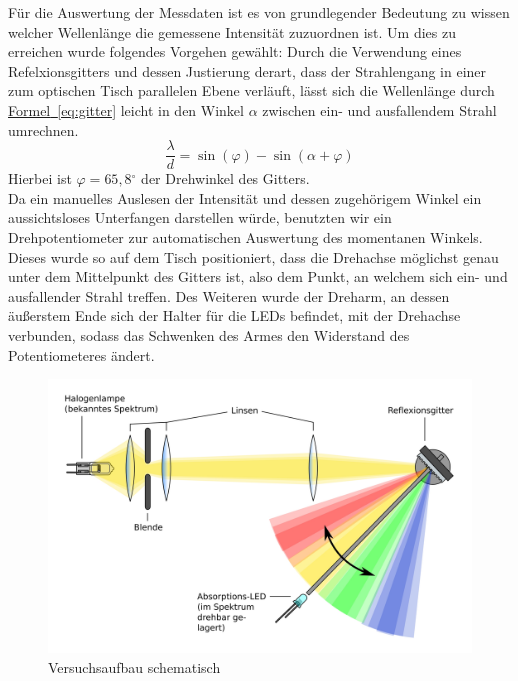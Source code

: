 \documentclass[11pt]{scrartcl}
\newcommand{\degr}{\ensuremath{^\circ}}
\newcommand{\hypref}[2]{\hyperref[#2]{{#1}~\ref{#2}}}
\begin{document}
F\"ur die Auswertung der Messdaten ist es von grundlegender Bedeutung zu wissen welcher Wellenl\"ange die gemessene Intensit\"at zuzuordnen ist. Um dies zu erreichen wurde folgendes Vorgehen gew\"ahlt: Durch die Verwendung eines Refelxionsgitters und dessen Justierung derart, dass der Strahlengang in einer zum optischen Tisch parallelen Ebene verl\"auft, l\"asst sich die Wellenl\"ange durch \hypref{Formel}{eq:gitter} leicht in den Winkel $\alpha$ zwischen ein- und ausfallendem Strahl umrechnen.
\begin{equation}
\frac{\lambda}{d} = \sin(\varphi) - \sin(\alpha + \varphi)
\label{eq:gitter}
\end{equation}
Hierbei ist $\varphi = 65,8\degr$ der Drehwinkel des Gitters.\\
Da ein manuelles Auslesen der Intensit\"at und dessen zugeh\"origem Winkel ein aussichtsloses Unterfangen darstellen w\"urde, benutzten wir ein Drehpotentiometer zur automatischen Auswertung des momentanen Winkels. Dieses wurde so auf dem Tisch positioniert, dass die Drehachse m\"oglichst genau unter dem Mittelpunkt des Gitters ist, also dem Punkt, an welchem sich ein- und ausfallender Strahl treffen. Des Weiteren wurde der Dreharm, an dessen äu\ss{}erstem Ende sich der Halter f\"ur die LEDs befindet, mit der Drehachse verbunden, sodass das Schwenken des Armes den Widerstand des Potentiometeres \"andert.
\begin{figure}[ht]
\begin{center}
\includegraphics[width=1.\textwidth]{setup.jpg}
\end{center}
\vspace{-1.5\baselineskip}
\caption{Versuchsaufbau schematisch}
\label{Versuchsaufbau}
\end{figure}
\end{document}
